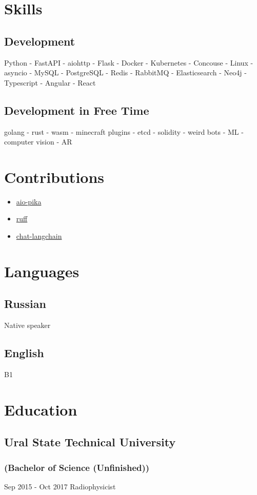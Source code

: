 \documentclass{article}
\begin{document}
\section*{Skills}
\subsection*{Development}
Python - FastAPI - aiohttp - Flask - Docker - Kubernetes - Concouse - Linux - asyncio - MySQL - PostgreSQL - Redis - RabbitMQ - Elasticsearch - Neo4j -Typescript - Angular - React

\subsection*{Development in Free Time}
golang - rust - wasm - minecraft plugins - etcd - solidity - weird bots - ML - computer vision - AR

\section*{Contributions}
\begin{itemize}
    \item \href{https://github.com/mosquito/aio-pika}{aio-pika}
    \item \href{https://github.com/astral-sh/ruff}{ruff}
    \item \href{https://github.com/langchain-ai/chat-langchain}{chat-langchain}
\end{itemize}

\section*{Languages}
\subsection*{Russian}
Native speaker 
\subsection*{English}
B1 

\section*{Education}
\subsection*{Ural State Technical University}
\subsubsection*{(Bachelor of Science (Unfinished))}
Sep 2015 - Oct 2017
Radiophysicist
\end{document}
